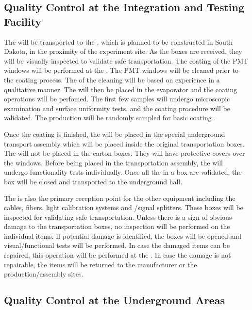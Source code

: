 \subsection{Quality Control at the Integration and Testing Facility}

The  will be transported to the , which is planned to be constructed in South Dakota, in the proximity of the experiment site. As the  boxes are received, they will be visually inspected to validate safe transportation. The  coating of the PMT windows will be performed at the . The PMT windows will be cleaned prior to the coating process. The  of the cleaning will be based on experience in a qualitative manner. The  will then be placed in the evaporator and the coating operations will be perfomed. The first few samples will undergo microscopic examination and surface uniformity tests, and the coating procedure will be validated. The production  will be randomly sampled for basic coating .

Once the coating is finished, the  will be placed in the special underground transport assembly which will be placed inside the original transportation boxes. The  will not be placed in the carton boxes. They will have protective covers over the windows. Before being placed in the transportation assembly, the  will undergo functionality tests individually. Once all the  in a box are validated, the box will be closed and transported to the underground hall.

The  is also the primary reception point for the other   equipment including the cables, fibers, light calibration systems and /signal splitters. These boxes will be inspected for validating safe transportation. Unless there is a sign of obvious damage to the transportation boxes, no  inspection will be performed on the individual items. If potential damage is identified, the boxes will be opened and visual/functional  tests will be performed. In case the damaged items can be repaired, this operation will be performed at the . In case the damage is not repairable, the items will be returned to the manufacturer or the production/assembly sites.

\subsection{Quality Control at the Underground Areas}

